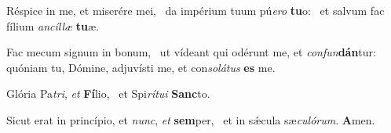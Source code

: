 \item Réspice in me, et miserére mei,~\pscross{} da impérium tuum pú\textit{ero} \textbf{tu}o:~\psstar{} et salvum fac fílium \textit{ancíllæ} \textbf{tu}æ.
\item Fac mecum signum in bonum,~\pscross{} ut vídeant qui odérunt me, et \textit{confun}\textbf{dán}tur:~\psstar{} quóniam tu, Dómine, adjuvísti me, et con\textit{solátus} \textbf{es} me.
\item Glória Pa\textit{tri}, \textit{et} \textbf{Fí}lio,~\psstar{} et Spi\textit{rítui} \textbf{Sanc}to.
\item Sicut erat in princípio, et \textit{nunc}, \textit{et} \textbf{sem}per,~\psstar{} et in sǽcula sæ\textit{culórum}. \textbf{A}men.
